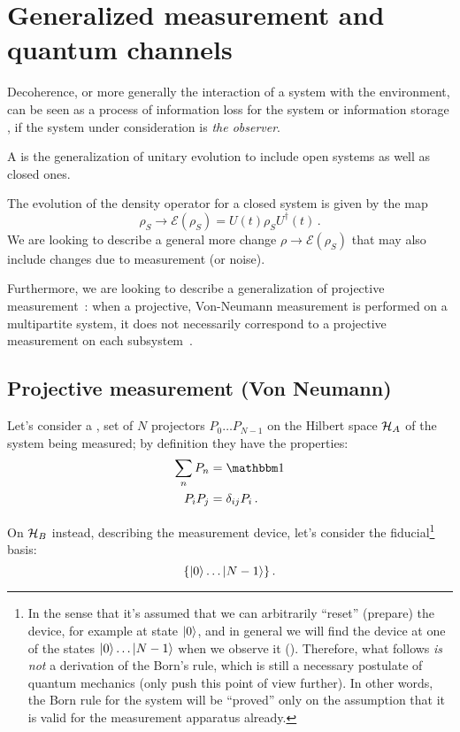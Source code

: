 \section{Generalized measurement and quantum channels}

Decoherence,
or more generally the interaction of a system with the environment,
can be seen as a process of information loss for the system
\parencite[Ch. 9]{Nakahara} or information storage
\parencite{Zurek_Einselect}, if the system under consideration
is \emph{the observer}.

A  \parencite[Ch. 9]{Nakahara} is the generalization
of unitary evolution to include open systems as well as closed ones.

The evolution of the density operator for a closed system is given by the map
\[
    \rho_{S} \rightarrow \mathcal{E}(\rho_{S}) = U(t)\rho_{S}U^{\dagger}(t) \, \text{.}
\] 
We are looking to describe a general more change
$\rho \rightarrow \mathcal{E}(\rho_{S})$ that may also include
changes due to measurement (or noise).

Furthermore, we are looking to describe a generalization
of projective measurement~\parencite{VonNeumann}:
when a projective, Von-Neumann
measurement is performed on a multipartite system,
it does not necessarily correspond to a projective measurement
on each subsystem~\parencite[Ch. 3]{PreskillNotes}.

\subsection{Projective measurement (Von Neumann)}

Let's consider a ,  set of $N$ projectors
$P_0 \dots P_{N-1}$ on the Hilbert space $\mathcal{H}_A$
of the system being measured;
by definition they have the properties:
\begin{align}
  \sum_n P_n  &= \idop \\
  P_i P_j     &= \delta_{ij}P_i \, \text{.}
\end{align}

On $\mathcal{H}_B$ instead, describing the measurement device, let's consider
the fiducial\footnote{
  In the sense that it's assumed
  that we can arbitrarily ``reset'' (prepare) the device,
  for example at state $\ket{0}$,
  and in general
  we will find the device at one of the states
  $\ket{0}\dots\ket{N-1}$
  when we observe it ().
  Therefore, what follows \emph{is not} a derivation of the Born's rule,
  which is still a necessary postulate of quantum mechanics
  (only \cite{Zurek_Decoherence, Zurek_Einselect, Zurek_Fundamentals} push
  this point of view further). In other words, the Born rule for the system
  will be ``proved''
  only on the assumption that it is valid for the measurement apparatus already.
}
basis:
\[
  \left\{\ket{0} \dots \ket{N-1}\right\} \text{.}
\]

